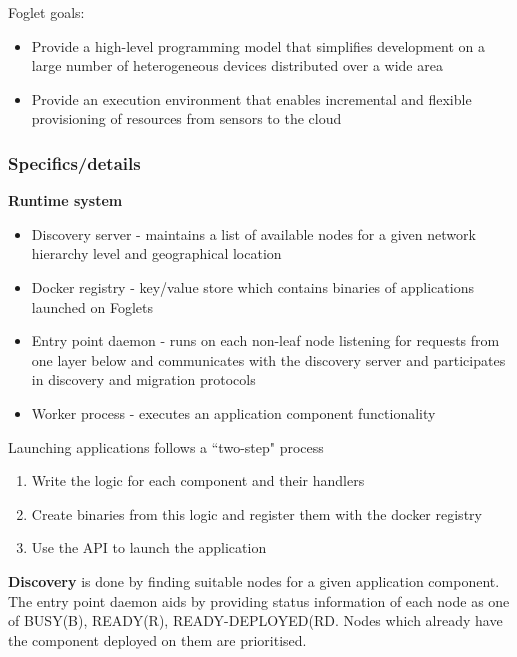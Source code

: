 \documentclass{sty/SizheArticle}
\begin{document}
Foglet goals:
\begin{itemize}
\item Provide a high-level programming model that simplifies development on a
large number of heterogeneous devices distributed over a wide area
\item Provide an execution environment that enables incremental and flexible
provisioning of resources from sensors to the cloud
\end{itemize}

\subsubsection{Specifics/details}
\textbf{Runtime system}
\begin{itemize}
\item Discovery server - maintains a list of available nodes for a given
network hierarchy level and geographical location
\item Docker registry - key/value store which contains binaries of applications
launched on Foglets
\item Entry point daemon - runs on each non-leaf node listening for requests
from one layer below and communicates with the discovery server and
participates in discovery and migration protocols
\item Worker process - executes an application component functionality
\end{itemize}

Launching applications follows a ``two-step" process
\begin{enumerate}
\item Write the logic for each component and their handlers
\item Create binaries from this logic and register them with the docker registry
\item Use the API to launch the application
\end{enumerate}

\textbf{Discovery} is done by finding suitable nodes for a given application
component. The entry point daemon aids by providing status information of
each node as one of \textsc{BUSY(B), READY(R), READY-DEPLOYED(RD}. Nodes
which already have the component deployed on them are prioritised.
\end{document}
